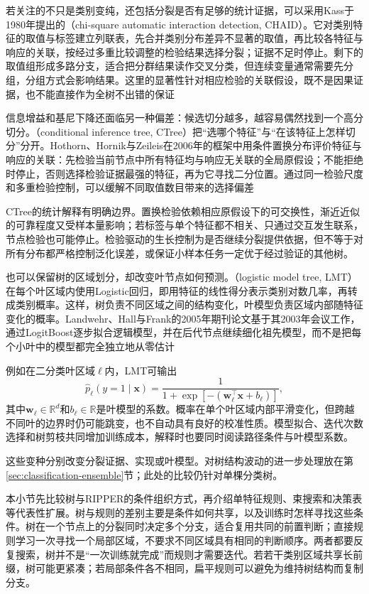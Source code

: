 若关注的不只是类别变纯，还包括分裂是否有足够的统计证据，可以采用Kass于1980年提出的（chi-square automatic interaction detection, CHAID）。它对类别特征的取值与标签建立列联表，先合并类别分布差异不显著的取值，再比较各特征与响应的关联，按经过多重比较调整的检验结果选择分裂；证据不足时停止。剩下的取值组形成多路分支，适合把分群结果读作交叉分类，但连续变量通常需要先分组，分组方式会影响结果。这里的显著性针对相应检验的关联假设，既不是因果证据，也不能直接作为全树不出错的保证

信息增益和基尼下降还面临另一种偏差：候选切分越多，越容易偶然找到一个高分切分。（conditional inference tree, CTree）把“选哪个特征”与“在该特征上怎样切分”分开。Hothorn、Hornik与Zeileis在2006年的框架中用条件置换分布评价特征与响应的关联：先检验当前节点中所有特征均与响应无关联的全局原假设；不能拒绝时停止，否则选择检验证据最强的特征，再为它寻找二分位置。通过同一检验尺度和多重检验控制，可以缓解不同取值数目带来的选择偏差

CTree的统计解释有明确边界。置换检验依赖相应原假设下的可交换性，渐近近似的可靠程度又受样本量影响；若标签与单个特征都不相关、只通过交互发生联系，节点检验也可能停止。检验驱动的生长控制为是否继续分裂提供依据，但不等于对所有分布都严格控制泛化误差，或保证小样本任务一定优于经过验证的其他树。

也可以保留树的区域划分，却改变叶节点如何预测。（logistic model tree, LMT）在每个叶区域内使用Logistic回归，即用特征的线性得分表示类别对数几率，再转成类别概率。这样，树负责不同区域之间的结构变化，叶模型负责区域内部随特征变化的概率。Landwehr、Hall与Frank的2005年期刊论文基于其2003年会议工作，通过LogitBoost逐步拟合逻辑模型，并在后代节点继续细化祖先模型，而不是把每个小叶中的模型都完全独立地从零估计

例如在二分类叶区域$\ell$内，LMT可输出
\begin{equation}
  \hat p_\ell(y=1\mid\bm{x})
  =\frac{1}{1+\exp[-(\bm{w}_\ell^\top\bm{x}+b_\ell)]},
  \label{eq:classification-lmt-leaf}
\end{equation}
其中$\bm{w}_\ell\in\mathbb{R}^d$和$b_\ell\in\mathbb{R}$是叶模型的系数。概率在单个叶区域内部平滑变化，但跨越不同叶的边界时仍可能跳变，也不自动具有良好的校准性质。模型拟合、迭代次数选择和树剪枝共同增加训练成本，解释时也要同时阅读路径条件与叶模型系数。

这些变种分别改变分裂证据、实现或叶模型。对树结构波动的进一步处理放在第\ref{sec:classification-ensemble}节；此处的比较仍针对单棵分类树。

本小节先比较树与RIPPER的条件组织方式，再介绍单特征规则、束搜索和决策表等代表性扩展。树与规则的差别主要是条件如何共享，以及训练时怎样寻找这些条件。树在一个节点上的分裂同时决定多个分支，适合复用共同的前置判断；直接规则学习一次寻找一个局部区域，不要求不同区域具有相同的判断顺序。两者都要反复搜索，树并不是“一次训练就完成”而规则才需要迭代。若若干类别区域共享长前缀，树可能更紧凑；若局部条件各不相同，扁平规则可以避免为维持树结构而复制分支。

